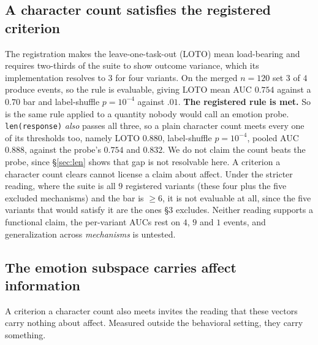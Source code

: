 \documentclass{article}
\begin{document}
\subsection{A character count satisfies the registered criterion}
\label{sec:prereg}

The registration makes the leave-one-task-out (LOTO) mean load-bearing and requires
two-thirds of the suite to show outcome variance, which its implementation
resolves to $3$ for four variants. On the merged $n = 120$ set $3$ of $4$ produce
events, so the rule is evaluable, giving LOTO mean AUC $\mathbf{0.754}$ against a $0.70$
bar and label-shuffle $p = 10^{-4}$ against $.01$. \textbf{The registered rule is
met.} So is the same rule applied to a quantity nobody would call an emotion probe.
\texttt{len(response)} \emph{also} passes all three, so a plain
character count meets every one of its thresholds too, namely LOTO $\mathbf{0.880}$,
label-shuffle $p = 10^{-4}$, pooled AUC $0.888$, against the probe's $0.754$ and
$0.832$.
We do not claim the count beats the probe, since \S\ref{sec:len} shows that gap is
not resolvable here. A criterion a character count clears cannot license a claim
about affect. Under the stricter reading, where the suite is all $9$ registered
variants (these four plus the five excluded mechanisms) and the bar is $\ge 6$, it is not evaluable at all, since the five
variants that would satisfy it are the ones \S3 excludes. Neither reading supports a
functional claim, the per-variant AUCs rest on $4$, $9$ and $1$ events, and
generalization across \emph{mechanisms} is untested.

\subsection{The emotion subspace carries affect information}
\label{sec:sem}

A criterion a character count also meets invites the reading that these vectors
carry nothing about affect. Measured outside the behavioral setting, they carry
something.
\end{document}
